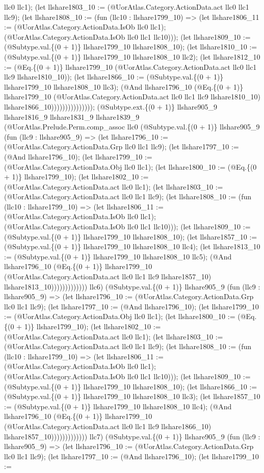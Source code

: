 \documentclass[11pt]{article}
\begin{document}
llc0 llc1); (let llshare1803\_10 := (@UorAtlas.Category.ActionData.act llc0 llc1 llc9); (let llshare1808\_10 := (fun (llc10 : llshare1799\_10) => (let llshare1806\_11 := (@UorAtlas.Category.ActionData.IsOb llc0 llc1); (@UorAtlas.Category.ActionData.IsOb llc0 llc1 llc10))); (let llshare1809\_10 := (@Subtype.val.\{(0 + 1)\} llshare1799\_10 llshare1808\_10); (let llshare1810\_10 := (@Subtype.val.\{(0 + 1)\} llshare1799\_10 llshare1808\_10 llc2); (let llshare1812\_10 := (@Eq.\{(0 + 1)\} llshare1799\_10 (@UorAtlas.Category.ActionData.act llc0 llc1 llc9 llshare1810\_10)); (let llshare1866\_10 := (@Subtype.val.\{(0 + 1)\} llshare1799\_10 llshare1808\_10 llc3); (@And llshare1796\_10 (@Eq.\{(0 + 1)\} llshare1799\_10 (@UorAtlas.Category.ActionData.act llc0 llc1 llc9 llshare1810\_10) llshare1866\_10))))))))))))))); (@Subtype.ext.\{(0 + 1)\} llshare905\_9 llshare1816\_9 llshare1831\_9 llshare1839\_9 (@UorAtlas.Prelude.Perm.comp\_assoc llc0 (@Subtype.val.\{(0 + 1)\} llshare905\_9 (fun (llc9 : llshare905\_9) => (let llshare1796\_10 := (@UorAtlas.Category.ActionData.Grp llc0 llc1 llc9); (let llshare1797\_10 := (@And llshare1796\_10); (let llshare1799\_10 := (@UorAtlas.Category.ActionData.Obj llc0 llc1); (let llshare1800\_10 := (@Eq.\{(0 + 1)\} llshare1799\_10); (let llshare1802\_10 := (@UorAtlas.Category.ActionData.act llc0 llc1); (let llshare1803\_10 := (@UorAtlas.Category.ActionData.act llc0 llc1 llc9); (let llshare1808\_10 := (fun (llc10 : llshare1799\_10) => (let llshare1806\_11 := (@UorAtlas.Category.ActionData.IsOb llc0 llc1); (@UorAtlas.Category.ActionData.IsOb llc0 llc1 llc10))); (let llshare1809\_10 := (@Subtype.val.\{(0 + 1)\} llshare1799\_10 llshare1808\_10); (let llshare1857\_10 := (@Subtype.val.\{(0 + 1)\} llshare1799\_10 llshare1808\_10 llc4); (let llshare1813\_10 := (@Subtype.val.\{(0 + 1)\} llshare1799\_10 llshare1808\_10 llc5); (@And llshare1796\_10 (@Eq.\{(0 + 1)\} llshare1799\_10 (@UorAtlas.Category.ActionData.act llc0 llc1 llc9 llshare1857\_10) llshare1813\_10))))))))))))) llc6) (@Subtype.val.\{(0 + 1)\} llshare905\_9 (fun (llc9 : llshare905\_9) => (let llshare1796\_10 := (@UorAtlas.Category.ActionData.Grp llc0 llc1 llc9); (let llshare1797\_10 := (@And llshare1796\_10); (let llshare1799\_10 := (@UorAtlas.Category.ActionData.Obj llc0 llc1); (let llshare1800\_10 := (@Eq.\{(0 + 1)\} llshare1799\_10); (let llshare1802\_10 := (@UorAtlas.Category.ActionData.act llc0 llc1); (let llshare1803\_10 := (@UorAtlas.Category.ActionData.act llc0 llc1 llc9); (let llshare1808\_10 := (fun (llc10 : llshare1799\_10) => (let llshare1806\_11 := (@UorAtlas.Category.ActionData.IsOb llc0 llc1); (@UorAtlas.Category.ActionData.IsOb llc0 llc1 llc10))); (let llshare1809\_10 := (@Subtype.val.\{(0 + 1)\} llshare1799\_10 llshare1808\_10); (let llshare1866\_10 := (@Subtype.val.\{(0 + 1)\} llshare1799\_10 llshare1808\_10 llc3); (let llshare1857\_10 := (@Subtype.val.\{(0 + 1)\} llshare1799\_10 llshare1808\_10 llc4); (@And llshare1796\_10 (@Eq.\{(0 + 1)\} llshare1799\_10 (@UorAtlas.Category.ActionData.act llc0 llc1 llc9 llshare1866\_10) llshare1857\_10))))))))))))) llc7) (@Subtype.val.\{(0 + 1)\} llshare905\_9 (fun (llc9 : llshare905\_9) => (let llshare1796\_10 := (@UorAtlas.Category.ActionData.Grp llc0 llc1 llc9); (let llshare1797\_10 := (@And llshare1796\_10); (let llshare1799\_10 := 
\end{document}
